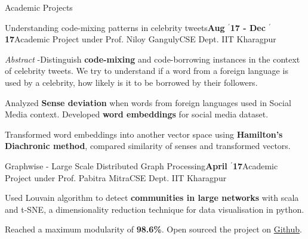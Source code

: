 \documentclass{resume} %
\begin{document}
\begin{rSection}{Academic Projects}

\begin{rSubsection}{ \large Understanding code-mixing patterns in celebrity tweets}{\textbf{\large Aug $^{\prime}$17 - Dec $^{\prime}$17}}{Academic Project under Prof. Niloy Ganguly}{CSE Dept. IIT Kharagpur}

\item \textit{Abstract} -Distinguish \textbf{code-mixing} and code-borrowing instances in the context of celebrity tweets. We try to understand if a word from a foreign language is used by a celebrity, how likely is it to be borrowed by their followers. 
\item Analyzed \textbf{Sense deviation} when words from foreign languages used in Social Media context. Developed \textbf{word embeddings} for social media dataset.
\item Transformed word embeddings into another vector space using \textbf{Hamilton's Diachronic method}, compared similarity of senses and transformed vectors.
\end{rSubsection}

\begin{rSubsection}{ \large Graphwise - Large Scale Distributed Graph Processing}{\textbf{\large April $^{\prime}$17}}{Academic Project under Prof. Pabitra Mitra}{CSE Dept. IIT Kharagpur}

\item Used Louvain algorithm to detect \textbf{communities in large networks} with scala and t-SNE, a dimensionality reduction technique for data visualisation in python.

\item Reached a maximum modularity of \textbf{98.6\%}. Open sourced the project on \href{https://github.com/kaustubhhiware/Graphwise}{Github}.
\end{rSubsection}


\end{rSection}
\end{document}
